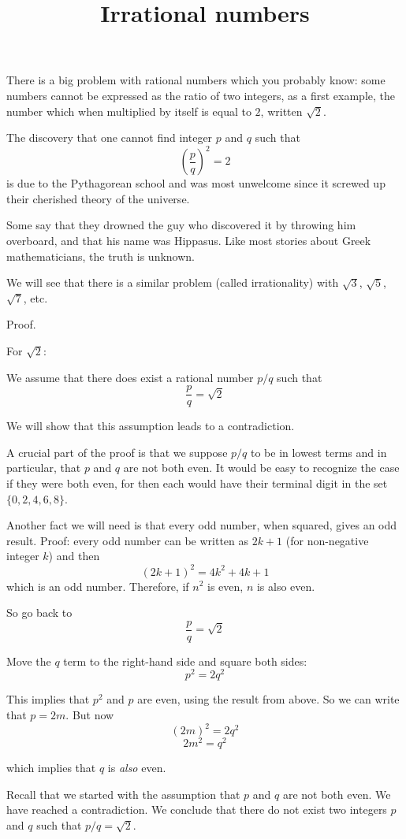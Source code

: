 \documentclass[11pt, oneside]{article}
\title{Irrational numbers}
\date{}
\begin{document}
\maketitle
\Large

There is a big problem with rational numbers which you probably know:  some numbers cannot be expressed as the ratio of two integers, as a first example, the number which when multiplied by itself is equal to $2$, written $\sqrt{2}$.  

The discovery that one cannot find integer $p$ and $q$ such that
\[ (\frac{p}{q})^2 = 2 \]
is due to the Pythagorean school and was most unwelcome since it screwed up their cherished theory of the universe.  

Some say that they drowned the guy who discovered it by throwing him overboard, and that his name was Hippasus.  Like most stories about Greek mathematicians, the truth is unknown.

We will see that there is a similar problem (called irrationality) with $\sqrt{3}$, $\sqrt{5}$, $\sqrt{7}$, etc.

Proof.

For $\sqrt{2}$:

We assume that there does exist a rational number $p/q$ such that
\[ \frac{p}{q} = \sqrt{2}  \]

We will show that this assumption leads to a contradiction.

A crucial part of the proof is that we suppose $p/q$ to be in lowest terms and in particular, that $p$ and $q$ are not both even.  It would be easy to recognize the case if they were both even, for then each would have their terminal digit in the set $\{ 0, 2, 4, 6, 8 \}$.

Another fact we will need is that every odd number, when squared, gives an odd result.  Proof:  every odd number can be written as $2k+1$ (for non-negative integer $k$) and then
\[ (2k+1)^2 = 4k^2 + 4k + 1 \]
which is an odd number.  Therefore, if $n^2$ is even, $n$ is also even.

So go back to 
\[ \frac{p}{q} = \sqrt{2}  \]

Move the $q$ term to the right-hand side and square both sides:
\[ p^2 = 2q^2 \]

This implies that $p^2$ and $p$ are even, using the result from above.   So we can write that $p = 2m$. But now
\[ (2m)^2 = 2q^2 \]
\[ 2m^2 = q^2 \]

which implies that $q$ is \emph{also} even.

Recall that we started with the assumption that $p$ and $q$ are not both even.  We have reached a contradiction.  We conclude that there do not exist two integers $p$ and $q$ such that $p/q = \sqrt{2}$.
\end{document}
